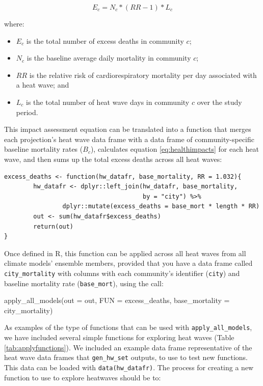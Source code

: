 \begin{equation}
E_c = N_c * (RR - 1) * L_c 
\label{eq:healthimpacts}
\end{equation}

where:

\begin{itemize}
\tightlist
\item
  \(E_c\) is the total number of excess deaths in community \(c\);
\item
  \(N_c\) is the baseline average daily mortality in community \(c\);
\item
  \(RR\) is the relative risk of cardiorespiratory mortality per day
  associated with a heat wave; and
\item
  \(L_c\) is the total number of heat wave days in community \(c\) over
  the study period.
\end{itemize}

This impact assessment equation can be translated into a function that
merges each projection's heat wave data frame with a data frame of
community-specific baseline mortality rates (\(B_c\)), calculates
equation \ref{eq:healthimpacts} for each heat wave, and then sums up the
total excess deaths across all heat waves:

\begin{verbatim}
excess_deaths <- function(hw_datafr, base_mortality, RR = 1.032){
        hw_datafr <- dplyr::left_join(hw_datafr, base_mortality,
                                      by = "city") %>%
                dplyr::mutate(excess_deaths = base_mort * length * RR)
        out <- sum(hw_datafr$excess_deaths)
        return(out)
}
\end{verbatim}

\noindent Once defined in R, this function can be applied across all
heat waves from all climate models' ensemble members, provided that you
have a data frame called \texttt{city\_mortality} with columns with each
community's identifier (\texttt{city}) and baseline mortality rate
(\texttt{base\_mort}), using the call:

\begin{Schunk}
\begin{Sinput}
apply_all_models(out = out, FUN = excess_deaths, base_mortality = city_mortality)
\end{Sinput}
\end{Schunk}

As examples of the type of functions that can be used with
\texttt{apply\_all\_models}, we have included several simple functions
for exploring heat waves (Table \ref{tab:applyfunctions}). We included
an example data frame representative of the heat wave data frames that
\texttt{gen\_hw\_set} outputs, to use to test new functions. This data
can be loaded with \texttt{data(hw\_datafr)}. The process for creating a
new function to use to explore heatwaves should be to:


